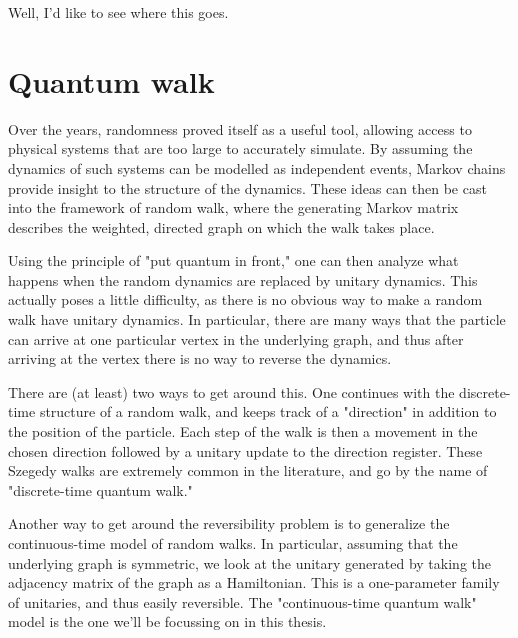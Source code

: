 % 



Well, I'd like to see where this goes.





\section{Quantum walk}
Over the years, randomness proved itself as a useful tool, allowing access to physical systems that are too large to accurately simulate.  By assuming the dynamics of such systems can be modelled as independent events, Markov chains provide insight to the structure of the dynamics.  These ideas can then be cast into the framework of random walk, where the generating Markov matrix describes the weighted, directed graph on which the walk takes place.  

Using the principle of "put quantum in front," one can then analyze what happens when the random dynamics are replaced by unitary dynamics.  This actually poses a little difficulty, as there is no obvious way to make a random walk have unitary dynamics.  In particular, there are many ways that the particle can arrive at one particular vertex in the underlying graph, and thus after arriving at the vertex there is no way to reverse the dynamics.

There are (at least) two ways to get around this.  One continues with the discrete-time structure of a random walk, and keeps track of a "direction" in addition to the position of the particle.  Each step of the walk is then a movement in the chosen direction followed by a unitary update to the direction register.   These Szegedy walks are extremely common in the literature, and go by the name of "discrete-time quantum walk."

Another way to get around the reversibility problem is to generalize the continuous-time model of random walks.  In particular, assuming that the underlying graph is symmetric, we look at the unitary generated by taking the adjacency matrix of the graph as a Hamiltonian.  This is a one-parameter family of unitaries, and thus easily reversible.  The "continuous-time quantum walk" model is the one we'll be focussing on in this thesis.

